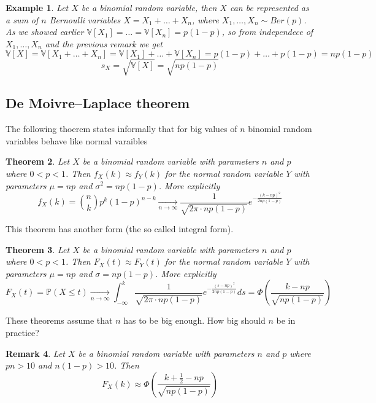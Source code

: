 \documentclass[12pt]{article}
\newtheorem{theorem}{Theorem}[subsection]
\newtheorem{remark}[theorem]{Remark}
\newtheorem{example}[theorem]{Example}
\begin{document}
\begin{example} Let $X$ be a binomial random variable, then $X$ can be
    represented as a sum of $n$ Bernoulli variables
    $X=X_1+\ldots+X_n$,  %
    where $X_1,\ldots,X_n\sim Ber(p)$. As we showed earlier
    $\mathbb{V}[X_1]=\ldots=\mathbb{V}[X_n]=p(1-p)$,   %
    so from independece of
    $X_1,\ldots, X_n$ and the previous remark we get
    $$
        \mathbb{V}[X]
        =\mathbb{V}[X_1+\ldots+X_n]    %
        =\mathbb{V}[X_1]+\ldots+\mathbb{V}[X_n]    %
        =p(1-p)+\ldots+p(1-p)=np(1-p)    %
    $$
    $$
        s_X=\sqrt{\mathbb{V}[X]}=\sqrt{np(1-p)}
    $$
\end{example}

\subsection{De Moivre–Laplace theorem}

The following thoerem states informally that for big values of $n$ 
binomial random variables behave like normal varaibles

\begin{theorem} Let $X$ be a binomial random variable with parameters $n$ and
    $p$ where $0<p<1$. Then $f_X(k)\approx f_Y(k)$ for the normal random
    variable $Y$ with parameters $\mu=np$ and $\sigma^2=np(1-p)$. More
    explicitly
    $$
        f_X(k)
        =\binom{n}{k}p^k {(1-p)}^{n-k}
        \underset{n\to\infty}{\to}
        \frac{1}{\sqrt{2\pi \cdot np(1-p)}}e^{-\frac{{(k-np)}^2}{2np(1-p)}}
    $$
\end{theorem}

This theorem has another form (the so called integral form).

\begin{theorem} Let $X$ be a binomial random variable with parameters $n$ and
    $p$ where $0<p<1$. Then $F_X(t)\approx F_Y(t)$ for the normal random
    variable $Y$ with parameters $\mu=np$ and $\sigma=np(1-p)$. More explicitly
    $$
        F_X(t)
        =\mathbb{P}(X\leq t)
        \underset{n\to\infty}{\to}
        \int_{-\infty}^k
        \frac{1}{\sqrt{2\pi \cdot np(1-p)}}
        e^{-\frac{{(s-np)}^2}{2np(1-p)}}ds
        =\Phi\left(\frac{k-np}{\sqrt{np(1-p)}}\right)
    $$
\end{theorem}

These theorems assume that $n$ has to be big enough. How big should $n$ be in
practice?

\begin{remark} Let $X$ be a binomial random variable with parameters $n$ and $p$
    where $pn>10$ and $n(1-p)>10$.  Then
    $$
        F_X(k)\approx\Phi\left(\frac{k+\frac{1}{2}-np}{\sqrt{np(1-p)}}\right)
    $$
\end{remark}
\end{document}
